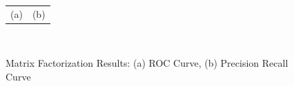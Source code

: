 \begin{figure}
\begin{tabular}{ l l}
  \hspace{3.5cm}(a) & \hspace{7cm}(b)\\
\end{tabular}\\
\caption{Matrix Factorization Results: (a) ROC Curve, (b) Precision Recall Curve}
\label{fig:matrixcurves}  
\end{figure}


